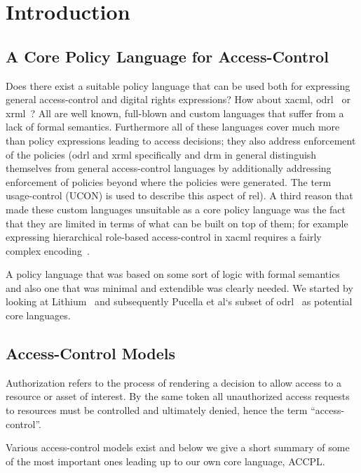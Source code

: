 \chapter{Introduction}

\section{A Core Policy Language for Access-Control} 

Does there exist a suitable policy language that can be used both for expressing general access-control and digital rights expressions? How about \ac{xacml}, \ac{odrl}~\cite{odrloneone} or \ac{xrml}~\cite{Wang}? All are well known, full-blown and custom languages that suffer from a lack of formal semantics. Furthermore all of these languages cover much more than policy expressions leading to access decisions; they also address enforcement of the policies (\ac{odrl} and \ac{xrml} specifically and \ac{drm} in general distinguish themselves from general access-control languages by additionally addressing enforcement of policies beyond where the policies were generated. The term usage-control (UCON) is used to describe this aspect of \ac{rel}). A third reason that made these custom languages unsuitable as a core policy language was the fact that they are limited in terms of what can be built on top of them; for example expressing hierarchical role-based access-control  in \ac{xacml} requires a fairly complex encoding~\cite{Tschantz}.

A policy language that was based on some sort of logic with formal semantics and also one that was minimal and extendible was clearly needed. We started by looking at Lithium~\cite{Halpern2008} and subsequently Pucella et al`s subset of \ac{odrl}~\cite{pucella2006} as potential core languages. 

\section{Access-Control Models~\cite{nist}}
Authorization refers to the process of rendering a decision to allow access to a resource or asset of interest. By the same token all unauthorized access requests to resources must be controlled and ultimately denied, hence the term ``access-control''. 

Various access-control models exist and below we give a short summary of some of the most important ones leading up to our own core language, \ac{ACCPL}.

